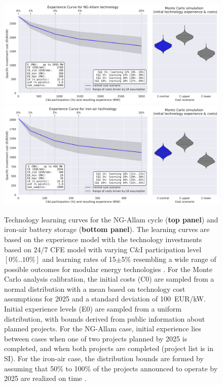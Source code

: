 \documentclass[pdflatex,sn-basic, Numbered]{sn-jnl}
\theoremstyle{thmstyleone}%
\theoremstyle{thmstyletwo}%
\theoremstyle{thmstylethree}%
\begin{document}
\begin{figure}[htbp]
    \centering
    \includegraphics[width=\textwidth]{images/e_curve_NG-Allam.pdf}
    \includegraphics[width=\textwidth]{images/e_curve_iron-air.pdf}
    \caption{Technology learning curves for the NG-Allam cycle (\textbf{top panel}) and iron-air battery storage (\textbf{bottom panel}).
    The learning curves are based on the experience model with the technology investments based on 24/7 CFE model with varying C\&I participation level $[0\%..10\%]$ and learning rates of 15$\pm$5\% resembling a wide range of possible outcomes for modular energy technologies \cite{wayEmpiricallyGroundedTechnology2022a}. For the Monte Carlo analysis calibration, the initial costs (C0) are sampled from a normal distribution with a mean based on technology cost assumptions for 2025 and a standard deviation of 100~EUR/kW. Initial experience levels (E0) are sampled from a uniform distribution, with bounds derived from public information about planned projects. For the NG-Allam case, initial experience lies between cases when one of two projects planned by 2025 is completed, and when both projects are completed (project list is in SI). For the iron-air case, the distribution bounds are formed by assuming that 50\% to 100\% of the projects announced to operate by 2025 are realized on time \cite{FormEnergyLatest2024}.
    }
    \label{fig:panels}
\end{figure}
\end{document}
